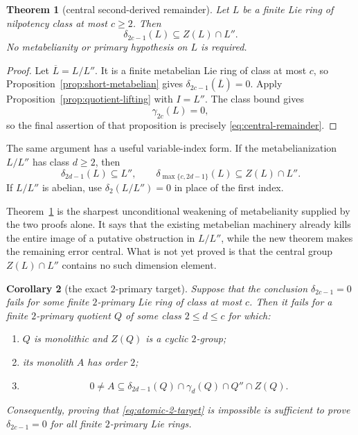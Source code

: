 \documentclass[a4paper,11pt,reqno]{amsart}
\newtheorem{theorem}{Theorem}[section]
\newtheorem{corollary}[theorem]{Corollary}
\theoremstyle{definition}
\theoremstyle{remark}
\newcommand{\dlt}{\delta}
\newcommand{\gm}{\gamma}
\begin{document}
\begin{theorem}[central second-derived remainder]\label{thm:central-remainder}
Let $L$ be a finite Lie ring of nilpotency class at most $c\geq2$.  Then
\begin{equation}\label{eq:central-remainder}
                    \dlt_{2c-1}(L)\subseteq Z(L)\cap L''.
\end{equation}
No metabelianity or primary hypothesis on $L$ is required.
\end{theorem}

\begin{proof}
Let $\overline L=L/L''$.  It is a finite metabelian Lie ring of class at most
$c$, so Proposition~\ref{prop:short-metabelian} gives
$\dlt_{2c-1}(\overline L)=0$.  Apply
Proposition~\ref{prop:quotient-lifting} with $I=L''$.  The class bound gives
\[
                         \gm_{2c}(L)=0,
\]
so the final assertion of that proposition is precisely
\eqref{eq:central-remainder}.
\end{proof}

The same argument has a useful variable-index form.  If the metabelianization
$L/L''$ has class $d\geq2$, then
\begin{equation}\label{eq:variable-remainder}
 \dlt_{2d-1}(L)\subseteq L'',\qquad
 \dlt_{\max\{c,2d-1\}}(L)\subseteq Z(L)\cap L''.
\end{equation}
If $L/L''$ is abelian, use $\dlt_2(L/L'')=0$ in place of the first index.

Theorem~\ref{thm:central-remainder} is the sharpest unconditional weakening of
metabelianity supplied by the two proofs alone.  It says that the existing
metabelian machinery already kills the entire image of a putative obstruction
in $L/L''$, while the new theorem makes the remaining error central.  What is
not yet proved is that the central group $Z(L)\cap L''$ contains no such
dimension element.

\begin{corollary}[the exact $2$-primary target]\label{cor:2-primary-target}
Suppose that the conclusion $\dlt_{2c-1}=0$ fails for some finite
$2$-primary Lie ring of class at most $c$.  Then it fails for a finite
$2$-primary quotient $Q$ of some class $2\leq d\leq c$ for which:
\begin{enumerate}[label=\textup{(\roman*)}]
\item $Q$ is monolithic and $Z(Q)$ is a cyclic $2$-group;
\item its monolith $A$ has order $2$;
\item
\begin{equation}\label{eq:atomic-2-target}
 0\ne A\subseteq
 \dlt_{2d-1}(Q)\cap\gm_d(Q)\cap Q''\cap Z(Q).
\end{equation}
\end{enumerate}
Consequently, proving that \eqref{eq:atomic-2-target} is impossible is
sufficient to prove $\dlt_{2c-1}=0$ for all finite $2$-primary Lie rings.
\end{corollary}
\end{document}
